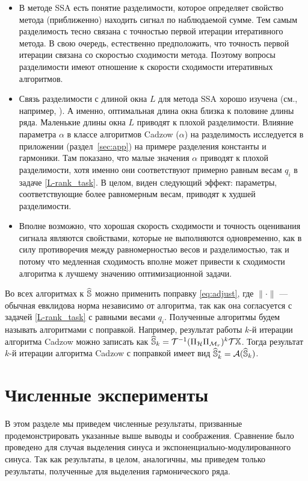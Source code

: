 \documentclass[12pt,a4paper,fleqn,leqno]{article}
\begin{document}
\begin{itemize}
\item
В методе SSA есть понятие разделимости, которое определяет свойство метода (приближенно) находить сигнал по наблюдаемой сумме. Тем самым разделимость
тесно связана с точностью первой итерации итеративного метода. В свою очередь, естественно предположить, что точность первой итерации связана со скоростью сходимости метода. Поэтому вопросы разделимости имеют отношение к скорости сходимости итеративных алгоритмов.
\item
Связь разделимости с длиной окна $L$ для метода SSA хорошо изучена (см., например, \cite{Golyandina2010}). А именно, оптимальная длина окна близка
к половине длины ряда. Маленькие длины окна $L$ приводят к плохой разделимости. Влияние параметра $\alpha$ в классе алгоритмов
Cadzow ($\alpha$) на разделимость исследуется в приложении (раздел~\ref{sec:app}) на примере разделения константы и гармоники. Там показано, что малые значения
$\alpha$ приводят к плохой разделимости, хотя именно они соответствуют примерно равным весам $q_i$ в задаче \eqref{L-rank_task}.
В целом, виден следующий эффект: параметры, соответствующие более равномерным весам, приводят к худшей разделимости.
\item
Вполне возможно, что хорошая скорость сходимости и точность оценивания сигнала являются свойствами, которые не выполняются одновременно, как в силу
противоречия между равномерностью весов и разделимостью, так и потому что медленная сходимость вполне может привести к сходимости алгоритма к лучшему значению оптимизационной задачи.
\end{itemize}

\begin{remark}
\label{rem:adjust}
Во всех алгоритмах к $\widehat{\mathbb{S}}$ можно применить поправку \eqref{eq:adjust}, где $\|\cdot\|$ --- обычная евклидова норма независимо от алгоритма,
так как она согласуется с задачей \eqref{L-rank_task} с равными весами $q_i$.
Полученные алгоритмы будем называть алгоритмами с поправкой.
Например, результат работы $k$-й итерации алгоритма Cadzow можно записать как $\widehat{\mathbb{S}}_k = \mathcal{T}^{-1}(\Pi_{\mathcal{H}} \Pi_{\mathcal{M}_r})^k \mathcal{T} \mathbb{X}$.
Тогда результат $k$-й итерации алгоритма Cadzow с поправкой имеет вид $\widehat{\mathbb{S}}_k^*=\mathcal{A}(\widehat{\mathbb{S}}_k)$.
\end{remark}

\section{Численные эксперименты}
\label{sec:simul}
В этом разделе мы приведем численные результаты, призванные продемонстрировать указанные выше выводы и соображения.
Сравнение было проведено для случая выделения синуса и экспоненциально-модулированного синуса.
Так как результаты, в целом, аналогичны, мы приведем только результаты, полученные для выделения гармонического ряда.
\end{document}
